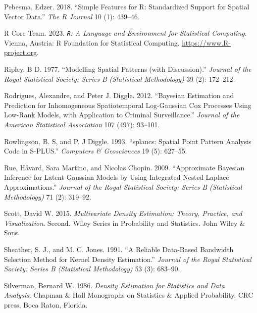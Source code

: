 \begin{CSLReferences}{1}{0}
\leavevmode{}%
Pebesma, Edzer. 2018. {``Simple Features for {R}: Standardized Support for Spatial Vector Data.''} \emph{The {R} Journal} 10 (1): 439--46.

\leavevmode{}%
R Core Team. 2023. \emph{\texttt{R}: A Language and Environment for Statistical Computing}. Vienna, Austria: {R} Foundation for Statistical Computing. \url{https://www.R-project.org}.

\leavevmode{}%
Ripley, B D. 1977. {``Modelling Spatial Patterns (with Discussion).''} \emph{Journal of the Royal Statistical Society: Series B (Statistical Methodology)} 39 (2): 172--212.

\leavevmode{}%
Rodrigues, Alexandre, and Peter J. Diggle. 2012. {``Bayesian Estimation and Prediction for Inhomogeneous Spatiotemporal Log-{G}aussian {C}ox Processes Using Low-Rank Models, with Application to Criminal Surveillance.''} \emph{Journal of the American Statistical Association} 107 (497): 93--101.

\leavevmode{}%
Rowlingson, B. S, and P. J Diggle. 1993. {``{splancs}: Spatial Point Pattern Analysis Code in {S-PLUS}.''} \emph{Computers \& Geosciences} 19 (5): 627--55.

\leavevmode{}%
Rue, Håvard, Sara Martino, and Nicolas Chopin. 2009. {``Approximate Bayesian Inference for Latent {G}aussian Models by Using Integrated Nested {L}aplace Approximations.''} \emph{Journal of the Royal Statistical Society: Series B (Statistical Methodology)} 71 (2): 319--92.

\leavevmode{}%
Scott, David W. 2015. \emph{Multivariate Density Estimation: Theory, Practice, and Visualization}. Second. Wiley Series in Probability and Statistics. John Wiley \& Sons.

\leavevmode{}%
Sheather, S. J., and M. C. Jones. 1991. {``A Reliable Data-Based Bandwidth Selection Method for Kernel Density Estimation.''} \emph{Journal of the Royal Statistical Society: Series B (Statistical Methodology)} 53 (3): 683--90.

\leavevmode{}%
Silverman, Bernard W. 1986. \emph{Density Estimation for Statistics and Data Analysis}. Chapman \& Hall Monographs on Statistics \& Applied Probability. CRC press, Boca Raton, Florida.


\end{CSLReferences}
